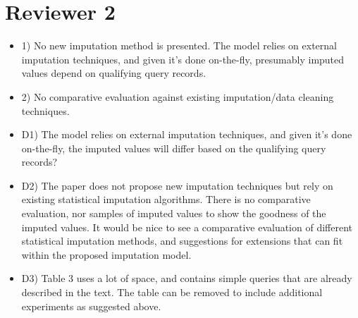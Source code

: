 \documentclass[draft,12pt]{article}
\newcommand{\resp}[1]{{\color{blue}{#1}}}
\begin{document}
\section{Reviewer 2}
\begin{itemize}
\item 1) No new imputation method is presented. The model relies on external imputation techniques, and given it's done on-the-fly, presumably imputed values depend on qualifying query records.

  \resp{Yes, the imputed results depend on the records which are relevant to particular query. We do not present a new imputation method, but our technique is agnostic to the particular imputation method used. We reduce the overhead of imputation by performing it only on the tuples which are relevant to a particular query.}
  
\item 2) No comparative evaluation against existing imputation/data cleaning techniques.

  \resp{Our evaluation compares our technique to an imputation of the full dataset. We use the same imputation algorithm for our on-the-fly imputation as for the full dataset imputation. Cleaning the full dataset is the standard method of handling missing values.}

\item D1) The model relies on external imputation techniques, and given it's done on-the-fly, the imputed values will differ based on the qualifying query records?

  \resp{Yes, as discussed above.}

\item D2) The paper does not propose new imputation techniques but rely on existing statistical imputation algorithms. There is no comparative evaluation, nor samples of imputed values to show the goodness of the imputed values. It would be nice to see a comparative evaluation of different statistical imputation methods, and suggestions for extensions that can fit within the proposed imputation model.

  \resp{The error measures that we provide compare our on-the-fly application of imputation to imputation over the full dataset.}

\item D3) Table 3 uses a lot of space, and contains simple queries that are already described in the text. The table can be removed to include additional experiments as suggested above.
\end{itemize}
\end{document}
